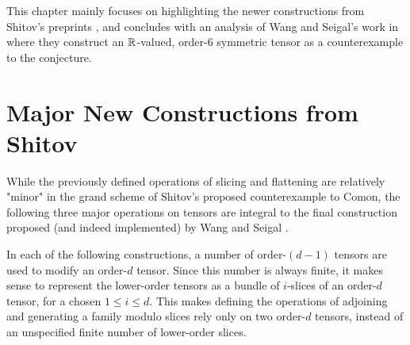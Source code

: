 \documentclass[../Lael_John_MasterThesis_Draft.tex]{subfiles}
\begin{document}
 
This chapter mainly focuses on highlighting the newer constructions from Shitov's preprints \cites{shitov_comons_2020,shitov_higher_2024,shitov_higher_2024-1}, and concludes with an analysis of Wang and Seigal's work in \cite{wang_lower_2023} where they construct an $\mathbb{R}$-valued, order-$6$ symmetric tensor as a counterexample to the conjecture.
\section{Major New Constructions from Shitov}\label{section:majorconstructions}
While the previously defined operations of slicing and flattening are relatively "minor" in the grand scheme of Shitov's proposed counterexample to Comon, the following three major operations on tensors are integral to the final construction proposed (and indeed implemented) by Wang and Seigal \cite{wang_lower_2023}. 


In each of the following constructions, a number of order-$(d-1)$ tensors are used to modify an order-$d$ tensor. Since this number is always finite, it makes sense to represent the lower-order tensors as a bundle of $i$-slices of an order-$d$ tensor, for a chosen $1 \leq i \leq d$. This makes defining the operations of adjoining and generating a family modulo slices rely only on two order-$d$ tensors, instead of an unspecified finite number of lower-order slices. 
\end{document}
